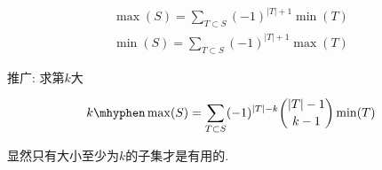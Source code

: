 $$ \begin{aligned} \max(S)=\sum_{T \subset S}(-1)^{|T|+1}\min(T) \\ \min(S)=\sum_{T \subset S}(-1)^{|T|+1}\max(T) \end{aligned} $$

推广: 求第$k$大

$$ \begin{aligned} k\mhyphen\max(S) = \sum_{T \subset S} (-1)^{|T|-k} {|T|-1 \choose k-1} \min(T) \end{aligned} $$

显然只有大小至少为$k$的子集才是有用的.